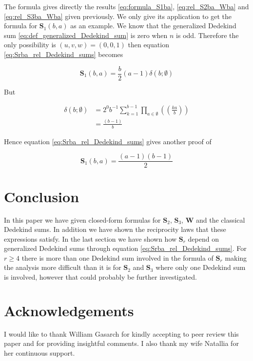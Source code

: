 \documentclass{article}%
\newcommand{\SUMS}[3]{\mathbf{S}_{#1}\left(#2,#3\right)}
\newcommand{\doublepariii}[1]{\left(\!\!\!\left(#1\right)\!\!\!\right)}
\begin{document}
The formula gives directly the results \ref{eq:formula_S1ba}, \ref{eq:rel_S2ba_Wba} and \ref{eq:rel_S3ba_Wba} given previously. We only give its application to get the formula for $\SUMS{1}{b}{a}$ as an example. We know that the generalized Dedekind sum \ref{eq:def_generalized_Dedekind_sum} is zero when $n$ is odd. Therefore the only possibility is $(u,v,w)=(0,0,1)$ then equation \ref{eq:Srba_rel_Dedekind_sums} becomes

\begin{equation*}
\SUMS{1}{b}{a} = \frac{b}{2} (a-1) \delta(b;\emptyset)
\end{equation*}

But

\begin{align*}
\delta(b;\emptyset)
&= 2^0b^{-1}\sum_{k=1}^{b-1}\prod_{a\in \emptyset} \doublepariii{\frac{ka}{b}} \\
&= \frac{(b-1)}{b}
\end{align*}

Hence equation \ref{eq:Srba_rel_Dedekind_sums} gives another proof of

\begin{equation*}
\SUMS{1}{b}{a} = \frac{(a-1)(b-1)}{2}
\end{equation*}

\section{Conclusion}

In this paper we have given closed-form formulas for $\mathbf{S}_2$, $\mathbf{S}_3$, $\mathbf{W}$ and the classical Dedekind sums. In addition we have shown the reciprocity laws that these expressions satisfy.  
 In the last section we have shown how $\mathbf{S}_r$ depend on generalized Dedekind sums through equation \ref{eq:Srba_rel_Dedekind_sums}. For $r\geq 4$ there is more than one Dedekind sum involved in the formula of $\mathbf{S}_r$ making the analysis more difficult than it is for $\mathbf{S}_2$ and $\mathbf{S}_3$ where only one Dedekind sum is involved, however that could probably be further investigated.

\section*{Acknowledgements} 

I would like to thank William Gasarch for kindly accepting to peer review this paper and for providing insightful comments. I also thank my wife Natallia for her continuous support.




\end{document}
